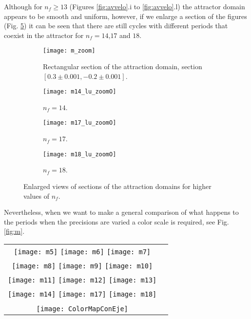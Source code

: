 Although for $n_f \geqslant 13$ (Figures \ref{fig:avvelo}.i to \ref{fig:avvelo}.l) the attractor domain appears to be smooth and uniform, however, if we enlarge a section of the figures (Fig. \ref{fig:m_zoom}) it can be seen that there are still cycles with different periods that coexist in the attractor for $n_f=14$,$17$ and $18$.

\begin{figure}
    \centering
    \begin{subfigure}[t]{0.49\textwidth}
        \texttt{[image: m\_zoom]}
        \caption{Rectangular section of the attraction domain, section $[0.3\pm 0.001, -0.2\pm 0.001]$.}
        \label{fig:gull}
    \end{subfigure}
    \hfill 
    \begin{subfigure}[t]{0.49\textwidth}
        \texttt{[image: m14\_lu\_zoomO]}
        \caption{$n_f=14$.}
        \label{fig:tiger}
    \end{subfigure}
   \hfill  
    \begin{subfigure}[t]{0.49\textwidth}
        \texttt{[image: m17\_lu\_zoomO]}
        \caption{$n_f=17$.}
        \label{fig:mouse}
    \end{subfigure}
  \hfill   
    \begin{subfigure}[t]{0.49\textwidth}
        \texttt{[image: m18\_lu\_zoomO]}
        \caption{$n_f=18$.}
        \label{fig:mouse}
    \end{subfigure}
    \caption{Enlarged views of sections of the attraction domains for higher values of $n_f$.}\label{fig:m_zoom}
\end{figure}


Nevertheless, when we want to make a general comparison of what happens to the periods when the precisions are varied a color scale is required, see Fig. \ref{fig:m}.
\begin{figure*}
\centering
\begin{tabular}{cc}
\texttt{[image: m5]}
\texttt{[image: m6]}
\texttt{[image: m7]}\\
\texttt{[image: m8]}
\texttt{[image: m9]}
\texttt{[image: m10]}\\
\texttt{[image: m11]}
\texttt{[image: m12]}
\texttt{[image: m13]}\\
\texttt{[image: m14]}
\texttt{[image: m17]}
\texttt{[image: m18]}\\
\\   
\texttt{[image: ColorMapConEje]}
\end{tabular}
\caption{Period's lengths evolution of the attraction domains for: (a) $n_f=5$, (b) $n_f=6$, (c) $n_f=7$, (d) $n_f=8$, (e) $n_f=9$, (f) $n_f=10$, (g) $n_f=11$, (h) $n_f=12$, (i) $n_f=13$, (j) $n_f=14$, (k) $n_f=17$, (l) $n_f=18$.}
\label{fig:m}
\end{figure*}

